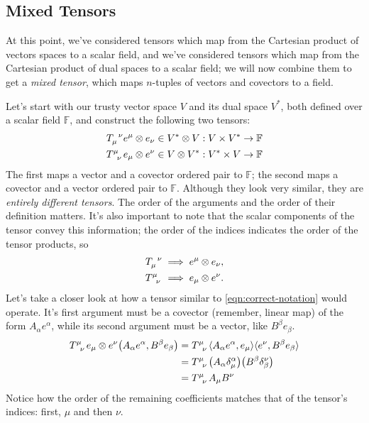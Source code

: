 \subsection{Mixed Tensors}
At this point, we've considered tensors which map from the Cartesian product of vectors spaces to a scalar field, and we've considered tensors which map from the Cartesian product of dual spaces to a scalar field; we will now combine them to get a \emph{mixed tensor}, which maps $n$-tuples of vectors and covectors to a field.

Let's start with our trusty vector space $V$ and its dual space $V^*$, both defined over a scalar field $\mathbb{F}$, and construct the following two tensors:
\begin{align}
    \tensor{T}{_{\mu}^\nu} e^\mu \otimes e_\nu \in V^* \otimes V : V \times V^* \to \mathbb{F} \\
    \tensor{T}{^{\mu}_{\nu}} e_\mu \otimes e^\nu \in V \otimes V^* : V^* \times V \to \mathbb{F}\label{eqn:correct-notation}
\end{align}
The first maps a vector and a covector ordered pair to $\mathbb{F}$; the second maps a covector and a vector ordered pair to $\mathbb{F}$.
Although they look very similar, they are \emph{entirely different tensors}.
The order of the arguments and the order of their definition matters.
It's also important to note that the scalar components of the tensor convey this information; the order of the indices indicates the order of the tensor products, so
\begin{align*}
    \tensor{T}{_{\mu}^\nu} \implies e^\mu \otimes e_\nu, \\
    \tensor{T}{^{\mu}_\nu} \implies e_\mu \otimes e^\nu.
\end{align*}
Let's take a closer look at how a tensor similar to \eqref{eqn:correct-notation} would operate.
It's first argument must be a covector (remember, linear map) of the form $A_\alpha e^\alpha$, while its second argument must be a vector, like $B^\beta e_\beta$.
\begin{align*}
    \tensor{T}{^{\mu}_{\nu}} e_\mu \otimes e^\nu \qty(A_\alpha e^\alpha, B^\beta e_\beta) &= \tensor{T}{^{\mu}_{\nu}} \langle A_\alpha e^\alpha, e_\mu \rangle \langle e^\nu, B^\beta e_\beta \rangle \\
    &= \tensor{T}{^{\mu}_{\nu}} \qty(A_\alpha \delta^\alpha_\mu) \qty(B^\beta \delta_\beta^\nu) \\
    &= \tensor{T}{^{\mu}_{\nu}} A_\mu B^\nu
\end{align*}
Notice how the order of the remaining coefficients matches that of the tensor's indices: first, $\mu$ and then $\nu$.

